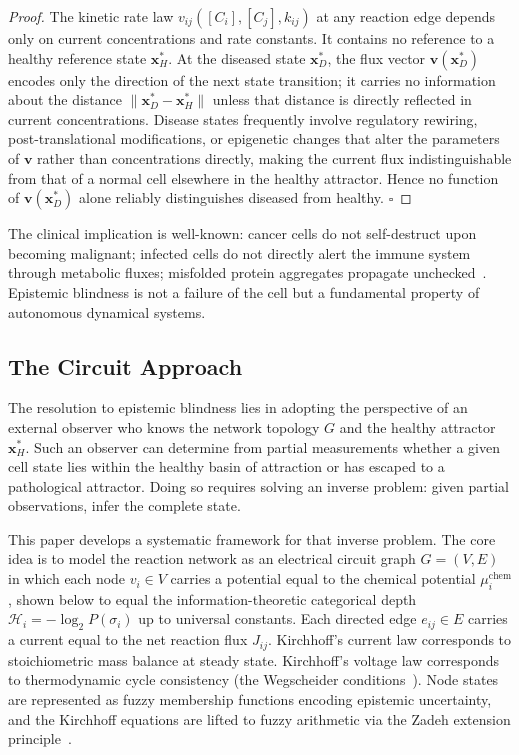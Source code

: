 \documentclass[twocolumn,10pt,a4paper]{article}
\newcommand{\Hcat}{\mathcal{H}}
\begin{document}
\begin{proof}
The kinetic rate law $v_{ij}([C_i],[C_j],k_{ij})$ at any reaction edge depends
only on current concentrations and rate constants.  It contains no reference to
a healthy reference state $\mathbf{x}^*_H$.  At the diseased state
$\mathbf{x}^*_D$, the flux vector $\mathbf{v}(\mathbf{x}^*_D)$ encodes only
the direction of the next state transition; it carries no information about the
distance $\|\mathbf{x}^*_D - \mathbf{x}^*_H\|$ unless that distance is
directly reflected in current concentrations.  Disease states frequently
involve regulatory rewiring, post-translational modifications, or epigenetic
changes that alter the parameters of $\mathbf{v}$ rather than concentrations
directly, making the current flux indistinguishable from that of a normal cell
elsewhere in the healthy attractor.  Hence no function of
$\mathbf{v}(\mathbf{x}^*_D)$ alone reliably distinguishes diseased from
healthy.  $\square$
\end{proof}

The clinical implication is well-known: cancer cells do not self-destruct upon
becoming malignant; infected cells do not directly alert the immune system
through metabolic fluxes; misfolded protein aggregates propagate
unchecked~\cite{Frauenfelder1991,Levinthal1969}.  Epistemic blindness is not a
failure of the cell but a fundamental property of autonomous dynamical systems.

\subsection{The Circuit Approach}
\label{sec:intro-circuit}

The resolution to epistemic blindness lies in adopting the perspective of an
external observer who knows the network topology $G$ and the healthy attractor
$\mathbf{x}^*_H$.  Such an observer can determine from partial measurements
whether a given cell state lies within the healthy basin of attraction or has
escaped to a pathological attractor.  Doing so requires solving an inverse
problem: given partial observations, infer the complete state.

This paper develops a systematic framework for that inverse problem.  The core
idea is to model the reaction network as an electrical circuit graph $G=(V,E)$
in which each node $v_i\in V$ carries a potential equal to the chemical
potential $\mu_i^{\mathrm{chem}}$, shown below to equal the
information-theoretic categorical depth $\Hcat_i=-\log_2 P(\sigma_i)$ up to
universal constants.  Each directed edge $e_{ij}\in E$ carries a current equal
to the net reaction flux $J_{ij}$.  Kirchhoff's current law corresponds to
stoichiometric mass balance at steady state.  Kirchhoff's voltage law
corresponds to thermodynamic cycle consistency (the Wegscheider
conditions~\cite{Wegscheider1901}).  Node states are represented as fuzzy
membership functions encoding epistemic uncertainty, and the Kirchhoff
equations are lifted to fuzzy arithmetic via the Zadeh extension
principle~\cite{Zadeh1965}.
\end{document}
